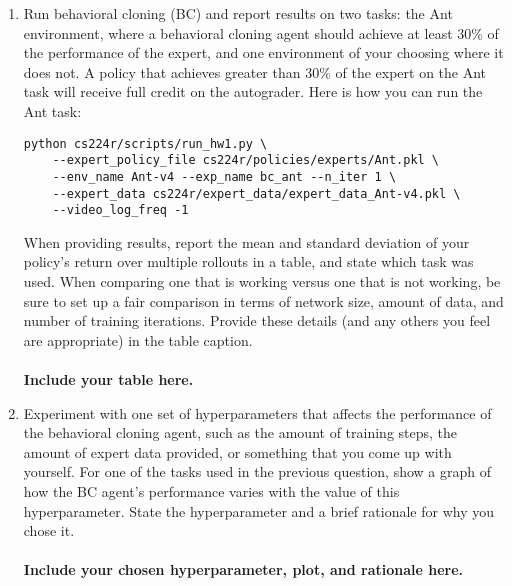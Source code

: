 \documentclass[12pt]{article}
\begin{document}
\begin{enumerate}
\item Run behavioral cloning (BC) and report results on two tasks: the Ant environment, where a behavioral cloning agent should achieve at least $30\%$ of the performance of the expert, and one environment of your choosing where it does not. A policy that achieves greater than $30\%$ of the expert on the Ant task will receive full credit on the autograder. Here is how you can run the Ant task:
\begin{tcolorbox}[width=\linewidth, sharp corners=all, colback=white!95!black]
\begin{verbatim}
python cs224r/scripts/run_hw1.py \
    --expert_policy_file cs224r/policies/experts/Ant.pkl \
    --env_name Ant-v4 --exp_name bc_ant --n_iter 1 \
    --expert_data cs224r/expert_data/expert_data_Ant-v4.pkl \
    --video_log_freq -1
\end{verbatim}
\end{tcolorbox}

\noindent When providing results, report the mean and standard deviation of your policy’s return over multiple rollouts in a table, and state which task was used. When comparing one that is working versus one that is not working, be sure to set up a fair comparison in terms of network size, amount of data, and number of training iterations. Provide these details (and any others you feel are appropriate) in the table caption.\\
\\
\textbf{\color{red}Include your table here.}

\item Experiment with one set of hyperparameters that affects the performance of the behavioral cloning agent, such as the amount of training steps, the amount of expert data provided, or something that you come up with yourself. For one of the tasks used in the previous question, show a graph of how the BC agent’s performance varies with the value of this hyperparameter. State the hyperparameter and a brief rationale for why you chose it.\\
\\
\textbf{\color{red}Include your chosen hyperparameter, plot, and rationale here.}

\end{enumerate}

\newpage
\end{document}
